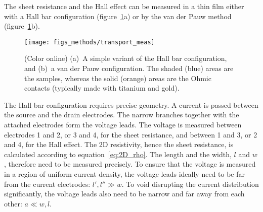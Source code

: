 The sheet resistance and the Hall effect can be measured in a thin film either with a Hall bar configuration (figure~\ref{fig:transport_meas}a) or by the van der Pauw method (figure~\ref{fig:transport_meas}b).%
\begin{figure}[ht]%
	\centering%
    \texttt{[image: figs\_methods/transport\_meas]}%
    \caption[A Hall bar and a van der Pauw pattern]{\label{fig:transport_meas}(Color online) (a)~A simple variant of the Hall bar configuration, and (b)~a van der Pauw configuration. The shaded (blue) areas are the samples, whereas the solid (orange) areas are the Ohmic contacts (typically made with titanium and gold).}%
\end{figure}%

The Hall bar configuration requires precise geometry. A current is passed between the source and the drain electrodes. The narrow branches together with the attached electrodes form the voltage leads. The voltage is measured between electrodes 1 and 2, or 3 and 4, for the sheet resistance, and between 1 and 3, or 2 and 4, for the Hall effect. The 2D resistivity, hence the sheet resistance, is calculated according to equation~\ref{eq:2D_rho}. The length and the width, $l$ and $w$, therefore need to be measured precisely. To ensure that the voltage is measured in a region of uniform current density, the voltage leads ideally need to be far from the current electrodes: $l', l'' \gg w$. To void disrupting the current distribution significantly, the voltage leads also need to be narrow and far away from each other: $a \ll w,l$.

